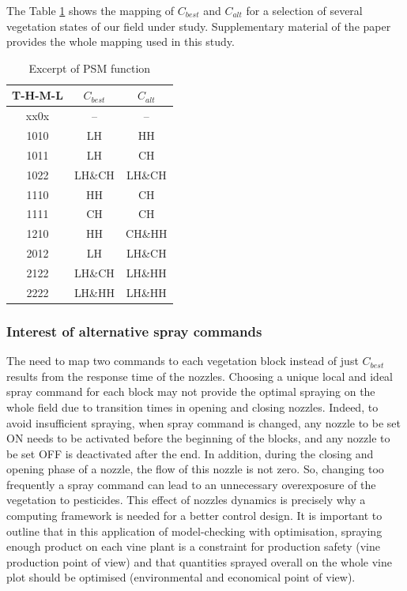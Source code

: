 \documentclass[preprint,3p,times,twocolumn]{elsarticle}
\begin{document}

The Table \ref{tb:PSM} shows the mapping of $C_{best}$ and $C_{alt}$ for a selection of several vegetation states of our field under study. Supplementary material of the paper provides the whole mapping used in this study.

\begin{table}[h!]
\begin{center}
	\begin{tabular}{|c|c|c|}
		\hline 
		T-H-M-L	&	$C_{best}$	&	$C_{alt}$	\\ \hline
		\rowcolor{yellow} xx0x	&	--	& --	\\ \hline
		1010	&	LH	&	HH	\\ \hline
		1011	&	LH	&	CH	\\ \hline
		
		\rowcolor{green} 1022	&	LH\&CH	&	LH\&CH	\\ \hline
		\rowcolor{green} 1110	&	HH	&	CH	\\ \hline
		\rowcolor{green} 1111	&	CH	&	CH	\\ \hline
		1210	&	HH	&	CH\&HH	\\ \hline
		2012	&	LH	&	LH\&CH	\\ \hline
		2122	&	LH\&CH	&	LH\&HH	\\ \hline %
		2222	&	LH\&HH	&	LH\&HH	\\ \hline
	\end{tabular} 
	\caption{Excerpt of PSM function  }\label{tb:PSM}
\end{center}
\end{table}

\subsubsection{Interest of alternative spray commands} 
\label{sec:InterestCalt}

The need to map two commands to each vegetation block instead of just $C_{best}$ results from the response time of the nozzles. Choosing a unique local and ideal spray command for each block may not provide the optimal spraying on the whole field due to transition times in opening and closing nozzles. 
Indeed, to avoid insufficient spraying, when spray command is changed, any nozzle to be set ON needs to be activated before the beginning of the blocks, and any nozzle to be set OFF is deactivated after the end. In addition, during the closing and opening phase of a nozzle, the flow of this nozzle is not zero. So, changing too frequently a spray command can lead to an unnecessary overexposure of the vegetation to pesticides. This effect of nozzles dynamics is precisely why a computing framework is needed for a better control design. It is important to outline that in this application of model-checking with optimisation, spraying enough product on each vine plant is a constraint for production safety (vine production point of view) and that quantities sprayed overall on the whole vine plot should be optimised (environmental and economical point of view).
\end{document}
